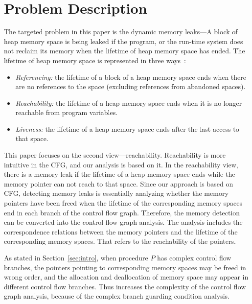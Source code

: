 \section{Problem Description}\label{sec:description}
The targeted problem in this paper is the dynamic memory leaks---A block of heap memory space is being leaked if the program, or the run-time system does not reclaim its memory when the lifetime of heap memory space has ended. 
The lifetime of heap memory space is represented in three ways~\cite{OR06}: 
\begin{itemize}
\item
\textit{Referencing:} the lifetime of a block of a heap memory space ends when there are no references to the space (excluding references from abandoned spaces).
\item 
\textit{Reachability:} the lifetime of a heap memory space ends when it is no longer reachable from program variables.
\item 
\textit{Liveness:} the lifetime of a heap memory space ends after the last access to that space.
\end{itemize}

This paper focuses on the second view---reachability. Reachability is more intuitive in the CFG, and our analysis is based on it.
In the reachability view, there is a memory leak if the lifetime of a heap memory space ends while the memory pointer can not reach to that space.
Since our approach is based on CFG, detecting memory leaks is essentially analyzing whether the memory pointers have been freed when the lifetime of the corresponding memory spaces end in each branch of the control flow graph. Therefore, the memory detection can be converted into the control flow graph analysis. The analysis includes the correspondence relations between the memory pointers and the lifetime of the corresponding memory spaces. That refers to the reachability of the pointers.

As stated in Section~\ref{sec:intro}, when procedure $P$ has complex control flow branches, the pointers pointing to corresponding memory spaces may be freed in wrong order, and the allocation and deallocation of memory space may appear in different control flow branches. Thus increases the complexity of the control flow graph analysis, because of the complex branch guarding condition analysis. %

